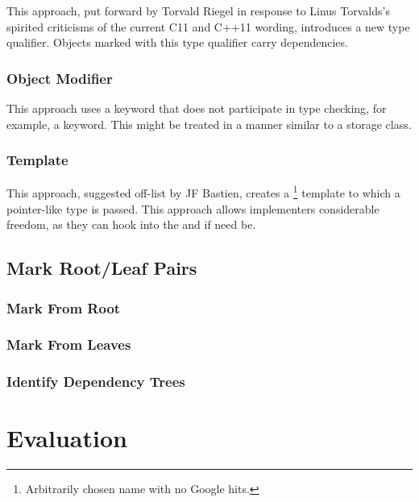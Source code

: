 \documentclass[letterpaper,twocolumn,10pt]{article}
\begin{document}
This approach, put forward by Torvald Riegel in response to
Linus Torvalds's spirited criticisms of the current C11 and C++11
wording, introduces a new  type qualifier.
Objects marked with this type qualifier carry dependencies.

\subsubsection{Object Modifier}
\label{sec:Object Modifier}

This approach uses a keyword that does not participate in type checking,
for example, a  keyword.
This might be treated in a manner similar to a storage class.

\subsubsection{Template}
\label{sec:Template}

This approach, suggested off-list by JF Bastien, creates a
\footnote{
	Arbitrarily chosen name with no Google hits.}
template to which a pointer-like type is passed.
This approach allows implementers considerable freedom, as they can
hook into the \co{->} and \co{*} if need be.

\subsection{Mark Root/Leaf Pairs}
\label{sec:Mark Root/Leaf Pairs}

\subsubsection{Mark From Root}
\label{sec:Mark From Root}

\subsubsection{Mark From Leaves}
\label{sec:Mark From Leaves}

\subsubsection{Identify Dependency Trees}
\label{sec:Identify Dependency Trees}

\section{Evaluation}
\label{sec:Evaluation}
\end{document}

